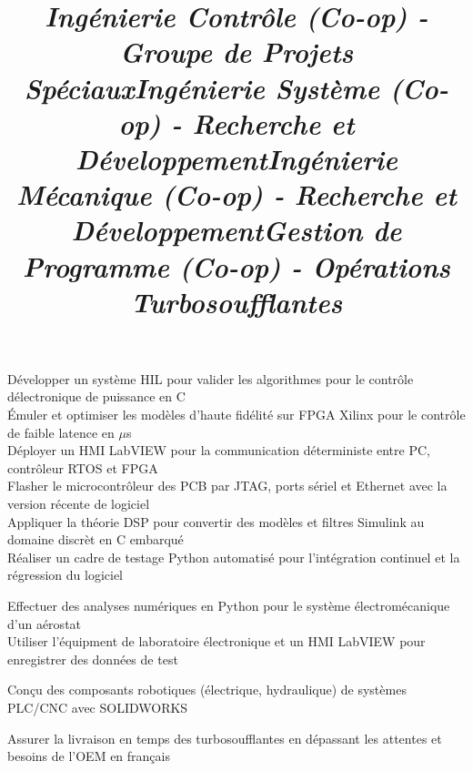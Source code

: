 \documentclass[mm]{res}
\begin{document}
\begin{resume}
\title{\textsl{Ing\'enierie Contr\^ole (Co-op) - Groupe de Projets Sp\'eciaux}}
\begin{position}
\tb D\'evelopper un syst\`eme HIL pour valider les algorithmes pour le contr\^ole d\textquotesingle \'electronique de puissance en C\\
\tb \'Emuler et optimiser les mod\`eles d'haute fid\'elit\'e sur FPGA Xilinx pour le contr\^ole de faible latence en $\mu$s\\
\tb D\'eployer un HMI LabVIEW pour la communication d\'eterministe entre PC, contr\^oleur RTOS et FPGA\\
\tb Flasher le microcontr\^oleur des PCB par JTAG, ports s\'eriel et Ethernet avec la version r\'ecente de logiciel \\
\tb Appliquer la th\'eorie DSP pour convertir des mod\`eles et filtres Simulink au domaine discr\`et en C embarqu\'e\\
\tb R\'ealiser un cadre de testage Python automatis\'e pour l'int\'egration continuel et la r\'egression du logiciel
\end{position}

\title{\textsl{Ing\'enierie Syst\`eme (Co-op) - Recherche et D\'eveloppement}}
\begin{position}
\tb Effectuer des analyses num\'eriques en Python pour le syst\`eme \'electrom\'ecanique d'un a\'erostat\\
\tb Utiliser l'\'equipment de laboratoire \'electronique et un HMI LabVIEW pour enregistrer des donn\'ees de test
\end{position}

\title{\textsl{Ing\'enierie M\'ecanique (Co-op) - Recherche et D\'eveloppement}}
\begin{position}
\tb Con\c{c}u des composants robotiques (\'electrique, hydraulique) de syst\`emes PLC/CNC avec SOLIDWORKS
\end{position}

\title{\textsl{Gestion de Programme (Co-op) - Op\'erations Turbosoufflantes}}
\begin{position}
\tb Assurer la livraison en temps des turbosoufflantes en d\'epassant les attentes et besoins de l'OEM en fran\c{c}ais
\end{position}


\end{resume}
\end{document}
